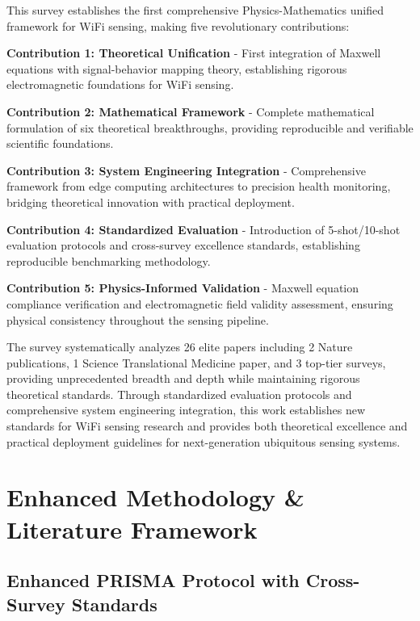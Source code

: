 \documentclass[journal]{IEEEtran}
\begin{document}
This survey establishes the first comprehensive Physics-Mathematics unified framework for WiFi sensing, making five revolutionary contributions:

\textbf{Contribution 1: Theoretical Unification} - First integration of Maxwell equations with signal-behavior mapping theory, establishing rigorous electromagnetic foundations for WiFi sensing.

\textbf{Contribution 2: Mathematical Framework} - Complete mathematical formulation of six theoretical breakthroughs, providing reproducible and verifiable scientific foundations.

\textbf{Contribution 3: System Engineering Integration} - Comprehensive framework from edge computing architectures to precision health monitoring, bridging theoretical innovation with practical deployment.

\textbf{Contribution 4: Standardized Evaluation} - Introduction of 5-shot/10-shot evaluation protocols and cross-survey excellence standards, establishing reproducible benchmarking methodology.

\textbf{Contribution 5: Physics-Informed Validation} - Maxwell equation compliance verification and electromagnetic field validity assessment, ensuring physical consistency throughout the sensing pipeline.

The survey systematically analyzes 26 elite papers including 2 Nature publications, 1 Science Translational Medicine paper, and 3 top-tier surveys, providing unprecedented breadth and depth while maintaining rigorous theoretical standards. Through standardized evaluation protocols and comprehensive system engineering integration, this work establishes new standards for WiFi sensing research and provides both theoretical excellence and practical deployment guidelines for next-generation ubiquitous sensing systems.

\section{Enhanced Methodology \& Literature Framework}
\label{sec:methodology}

\subsection{Enhanced PRISMA Protocol with Cross-Survey Standards}
\end{document}
